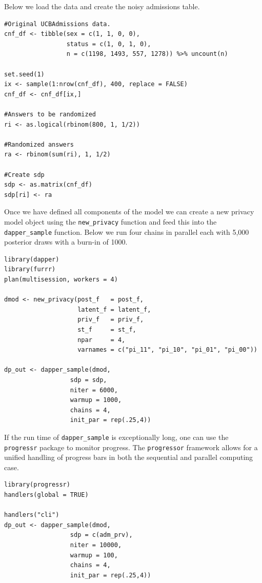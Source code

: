 Below we load the data and create the noisy admissions table.

\begin{verbatim}
#Original UCBAdmissions data.
cnf_df <- tibble(sex = c(1, 1, 0, 0),
                 status = c(1, 0, 1, 0),
                 n = c(1198, 1493, 557, 1278)) %>% uncount(n)

set.seed(1) 
ix <- sample(1:nrow(cnf_df), 400, replace = FALSE)
cnf_df <- cnf_df[ix,]

#Answers to be randomized
ri <- as.logical(rbinom(800, 1, 1/2)) 

#Randomized answers
ra <- rbinom(sum(ri), 1, 1/2)

#Create sdp
sdp <- as.matrix(cnf_df)
sdp[ri] <- ra
\end{verbatim}

Once we have defined all components of the model we can
create a new privacy model object using the \texttt{new\_privacy} function and
feed this into the \texttt{dapper\_sample} function. Below we run four chains
in parallel each with 5,000 posterior draws with a burn-in of 1000.

\begin{verbatim}
library(dapper)
library(furrr)
plan(multisession, workers = 4)

dmod <- new_privacy(post_f   = post_f,
                    latent_f = latent_f,
                    priv_f   = priv_f,
                    st_f     = st_f,
                    npar     = 4,
                    varnames = c("pi_11", "pi_10", "pi_01", "pi_00"))
                  
dp_out <- dapper_sample(dmod,
                  sdp = sdp,
                  niter = 6000,
                  warmup = 1000,
                  chains = 4,
                  init_par = rep(.25,4))
\end{verbatim}

If the run time of \texttt{dapper\_sample} is exceptionally long, one can
use the \texttt{progressr} package to monitor progress. The \texttt{progressor} framework
allows for a unified handling of progress bars in both the sequential and
parallel computing case.

\begin{verbatim}
library(progressr)
handlers(global = TRUE)

handlers("cli")
dp_out <- dapper_sample(dmod,
                  sdp = c(adm_prv),
                  niter = 10000,
                  warmup = 100,
                  chains = 4,
                  init_par = rep(.25,4))
\end{verbatim}

